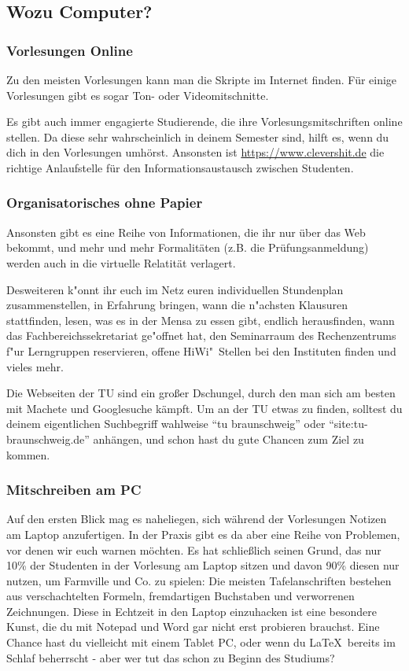 \begin{multicols}{2}
	\subsection{Wozu Computer?}
		\subsubsection{Vorlesungen Online}
			Zu den meisten Vorlesungen kann man die Skripte im Internet finden. Für einige Vorlesungen gibt es sogar Ton- oder Videomitschnitte.

			Es gibt auch immer engagierte Studierende, die ihre Vorlesungsmitschriften online stellen. Da diese sehr wahrscheinlich in deinem Semester sind, hilft es, wenn du dich in den Vorlesungen umhörst. Ansonsten ist \url{https://www.clevershit.de} die richtige Anlaufstelle für den Informationsaustausch zwischen Studenten.

		\subsubsection{Organisatorisches ohne Papier}
			Ansonsten gibt es eine Reihe von Informationen, die ihr nur über das Web bekommt, und mehr und mehr Formalitäten (z.B. die Prüfungsanmeldung) werden auch in die virtuelle Relatität verlagert.

			Desweiteren k"onnt ihr euch im Netz euren individuellen Stundenplan zusammenstellen, in Erfahrung bringen, wann die n"achsten Klausuren stattfinden, lesen, was es in der Mensa zu essen gibt, endlich herausfinden, wann das Fachbereichssekretariat ge"offnet hat, den Seminarraum des Rechenzentrums f"ur Lerngruppen reservieren, offene HiWi"~Stellen bei den Instituten finden und vieles mehr.

			Die Webseiten der TU sind ein großer Dschungel, durch den man sich am besten  mit Machete und Googlesuche kämpft. Um an der TU etwas zu finden, solltest du deinem eigentlichen Suchbegriff wahlweise \enquote{tu braunschweig} oder \enquote{site:tu-braunschweig.de} anhängen, und schon hast du gute Chancen zum Ziel zu kommen.

		\subsubsection{Mitschreiben am PC}
			Auf den ersten Blick mag es naheliegen, sich während der Vorlesungen Notizen  am Laptop anzufertigen. In der Praxis gibt es da aber eine Reihe von Problemen, vor denen wir euch warnen möchten. Es hat schließlich seinen Grund, das nur 10\% der Studenten in der Vorlesung am Laptop sitzen und davon 90\% diesen nur nutzen, um Farmville und Co. zu spielen: Die meisten Tafelanschriften bestehen  aus verschachtelten Formeln, fremdartigen Buchstaben und verworrenen Zeichnungen. Diese in Echtzeit in den Laptop einzuhacken ist eine besondere Kunst, die du mit Notepad und Word gar nicht erst probieren brauchst. Eine Chance hast du vielleicht mit einem Tablet PC, oder wenn du \LaTeX\ bereits im Schlaf beherrscht - aber wer tut das schon zu Beginn des Studiums?


\end{multicols}
